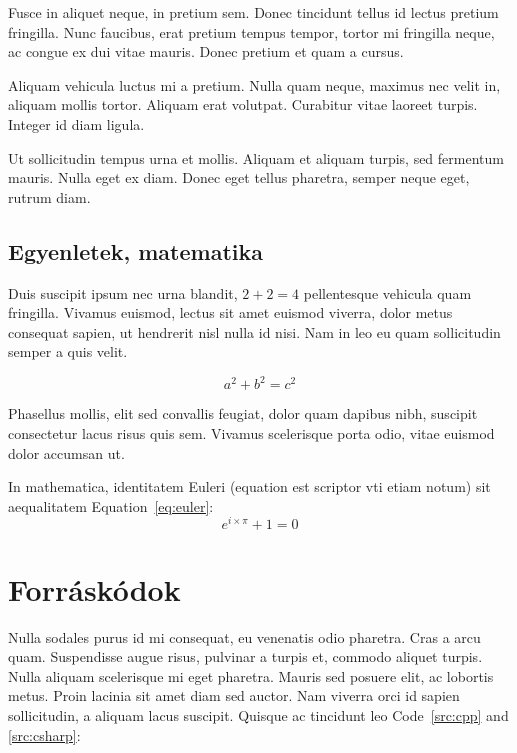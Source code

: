 Fusce in aliquet neque, in pretium sem. Donec tincidunt tellus id lectus pretium fringilla. Nunc faucibus, erat pretium tempus tempor, tortor mi fringilla neque, ac congue ex dui vitae mauris. Donec pretium et quam a cursus.

\begin{note}
Aliquam vehicula luctus mi a pretium. Nulla quam neque, maximus nec velit in, aliquam mollis tortor. Aliquam erat volutpat. Curabitur vitae laoreet turpis. Integer id diam ligula.
\end{note}

Ut sollicitudin tempus urna et mollis. Aliquam et aliquam turpis, sed fermentum mauris. Nulla eget ex diam. Donec eget tellus pharetra, semper neque eget, rutrum diam.

\subsection{Egyenletek, matematika} %

Duis suscipit ipsum nec urna blandit, $2 + 2 = 4$ pellentesque vehicula quam fringilla. Vivamus euismod, lectus sit amet euismod viverra, dolor metus consequat sapien, ut hendrerit nisl nulla id nisi. Nam in leo eu quam sollicitudin semper a quis velit.

$$a^2 + b^2 = c^2$$

Phasellus mollis, elit sed convallis feugiat, dolor quam dapibus nibh, suscipit consectetur lacus risus quis sem. Vivamus scelerisque porta odio, vitae euismod dolor accumsan ut.

In mathematica, identitatem Euleri (equation est scriptor vti etiam notum) sit aequalitatem Equation~\ref{eq:euler}:
\begin{equation}\label{eq:euler}
e^{i \times \pi} + 1 = 0
\end{equation}


\section{Forráskódok} %

Nulla sodales purus id mi consequat, eu venenatis odio pharetra. Cras a arcu quam. Suspendisse augue risus, pulvinar a turpis et, commodo aliquet turpis. Nulla aliquam scelerisque mi eget pharetra. Mauris sed posuere elit, ac lobortis metus. Proin lacinia sit amet diam sed auctor. Nam viverra orci id sapien sollicitudin, a aliquam lacus suscipit. Quisque ac tincidunt leo Code~\ref{src:cpp} and \ref{src:csharp}:

